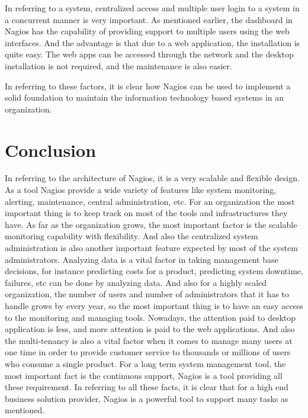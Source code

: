 \documentclass[9pt,twocolumn,twoside]{styles/osajnl}
\begin{document}
In referring to a system, centralized access and multiple user login to a system in a concurrent manner is very important. As mentioned earlier, the dashboard in Nagios has the capability of providing support to multiple users using the web interfaces. And the advantage is that due to a web application, the installation is quite easy. The web apps can be accessed through the network and the desktop installation is not required, and the maintenance is also easier.

In referring to these factors, it is clear how Nagios can be used to implement a solid foundation to maintain the information technology based systems in an organization.

\section{Conclusion}

In referring to the architecture of Nagios, it is a very scalable and flexible design. As a tool Nagios provide a wide variety of features like system monitoring, alerting, maintenance, central administration, etc. For an organization the most important thing is to keep track on most of the tools and infrastructures they have. As far as the organization grows, the most important factor is the scalable monitoring capability with flexibility. And also the centralized system administration is also another important feature expected by most of the system administrators. Analyzing data is a vital factor in taking management base decisions, for instance predicting costs for a product, predicting system downtime, failures, etc can be done by analyzing data. And also for a highly scaled organization, the number of users and number of administrators that it has to handle grows by every year, so the most important thing is to have an easy access to the monitoring and managing tools. Nowadays, the attention paid to desktop application is less, and more attention is paid to the web applications. And also the multi-tenancy is also a vital factor when it comes to manage many users at one time in order to provide customer service to thousands or millions of users who consume a single product. For a long term system management tool, the most important fact is the continuous support, Nagios is a tool providing all these requirement. In referring to all these facts, it is clear that for a high end business solution provider, Nagios is a powerful tool to support many tasks as mentioned. 
\end{document}
